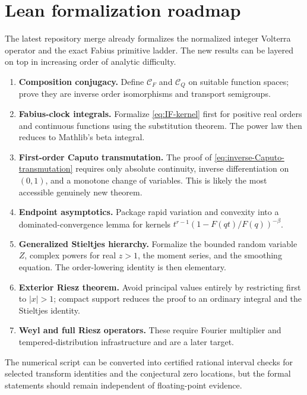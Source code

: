 \documentclass[11pt,oneside]{article}
\numberwithin{equation}{section}
\theoremstyle{plain}
\theoremstyle{definition}
\theoremstyle{remark}
\begin{document}
\section{Lean formalization roadmap}
\label{sec:Lean}

The latest repository merge already formalizes the normalized integer
Volterra operator and the exact Fabius primitive ladder.  The new results can
be layered on top in increasing order of analytic difficulty.

\begin{enumerate}
\item \textbf{Composition conjugacy.}  Define $\mathcal C_F$ and
      $\mathcal C_Q$ on suitable function spaces; prove they are inverse
      order isomorphisms and transport semigroups.
\item \textbf{Fabius-clock integrals.}  Formalize
      \cref{eq:IF-kernel} first for positive real orders and continuous
      functions using the substitution theorem.  The power law then reduces
      to Mathlib's beta integral.
\item \textbf{First-order Caputo transmutation.}  The proof of
      \cref{eq:inverse-Caputo-transmutation} requires only absolute
      continuity, inverse differentiation on $(0,1)$, and a monotone change of
      variables.  This is likely the most accessible genuinely new theorem.
\item \textbf{Endpoint asymptotics.}  Package rapid variation and convexity
      into a dominated-convergence lemma for kernels
      $t^{r-1}(1-F(qt)/F(q))^{-\beta}$.
\item \textbf{Generalized Stieltjes hierarchy.}  Formalize the bounded random
      variable $Z$, complex powers for real $z>1$, the moment series, and the
      smoothing equation.  The order-lowering identity is then elementary.
\item \textbf{Exterior Riesz theorem.}  Avoid principal values entirely by
      restricting first to $|x|>1$; compact support reduces the proof to an
      ordinary integral and the Stieltjes identity.
\item \textbf{Weyl and full Riesz operators.}  These require Fourier
      multiplier and tempered-distribution infrastructure and are a later
      target.
\end{enumerate}

The numerical script can be converted into certified rational interval checks
for selected transform identities and the conjectural zero locations, but the
formal statements should remain independent of floating-point evidence.
\end{document}
